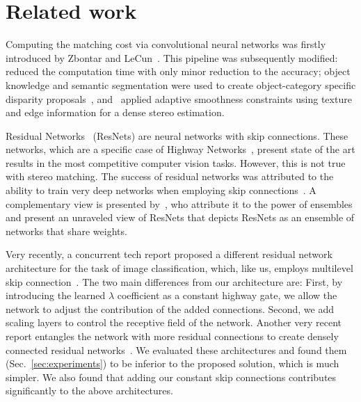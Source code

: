 \documentclass[10pt, twocolumn, letterpaper]{article}
\begin{document}
\section{Related work}

Computing the matching cost via convolutional neural networks was firstly introduced by Zbontar and LeCun~\cite{oldlecun,newlecun}. This pipeline was subsequently modified:~\cite{efficient} reduced the computation time with only minor reduction to the accuracy; object knowledge and semantic segmentation were used to create object-category specific disparity proposals~\cite{displets}, and~\cite{adaptive} applied adaptive smoothness constraints using texture and edge information for a dense stereo estimation.

Residual Networks~\cite{residual} (ResNets) are neural networks with skip connections. These networks, which are a specific case of Highway Networks~\cite{srivastava2015highway}, present state of the art results in the most competitive computer vision tasks. However, this is not true with stereo matching. The success of residual networks was attributed to the ability to train very deep networks when employing skip connections~\cite{he2016identity}. A complementary view is presented by~\cite{Veit2016}, who attribute it to the power of ensembles and present an unraveled view of ResNets that depicts ResNets as an ensemble of networks that share weights. 

Very recently, a concurrent tech report proposed a different residual network architecture for the task of image classification, which, like us, employs multilevel skip connection~\cite{resinres}. The two main differences from our architecture are: First, by introducing the learned $\lambda$ coefficient as a constant highway gate, we allow the network to adjust the contribution of the added connections. Second, we add scaling layers to control the receptive field of the network.
Another very recent report entangles the network with more residual connections to create densely connected residual networks~\cite{dense}. We evaluated these architectures and found them (Sec.~\ref{sec:experiments}) to be inferior to the proposed solution, which is much simpler. We also found that adding our constant skip connections contributes significantly to the above architectures.
\end{document}
